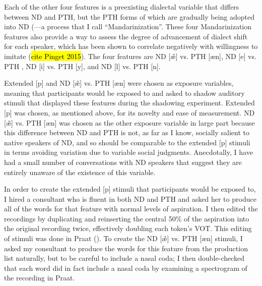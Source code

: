 Each of the other four features is a preexisting dialectal variable that differs between ND and PTH, but the PTH forms of which are gradually being adopted into ND (\cite{bao1980sixty}---a process that I call ``Mandarinization''. These four Mandarinization features also provide a way to assess the degree of advancement of dialect shift for each speaker, which has been shown to correlate negatively with willingness to imitate (\hl{cite Pinget 2015}). The four features are ND [\~{\ae}] vs. PTH [\ae n], ND [e] vs. PTH \textipa{[iE]}, ND [i] vs. PTH [y], and ND [l] vs. PTH [n].  %

Extended [p] and ND [\~{\ae}] vs. PTH [\ae n] were chosen as exposure variables, meaning that participants would be exposed to and asked to shadow auditory stimuli that displayed these features during the shadowing experiment. Extended [p] was chosen, as mentioned above, for its novelty and ease of measurement. ND [\~{\ae}] vs. PTH [\ae n] was chosen as the other exposure variable in large part because this difference between ND and PTH is not, as far as I know, socially salient to native speakers of ND, and so should be comparable to the extended [p] stimuli in terms avoiding variation due to variable social judgments. Anecdotally, I have had a small number of conversations with ND speakers that suggest they are entirely unaware of the existence of this variable.


In order to create the extended [p] stimuli that participants would be exposed to, I hired a consultant who is fluent in both ND and PTH and asked her to produce all of the words for that feature with normal levels of aspiration. I then edited the recordings by duplicating and reinserting the central 50\% of the aspiration into the original recording twice, effectively doubling each token’s VOT. This editing of stimuli was done in Praat (\cite{praat}). To create the ND [\~{\ae}] vs. PTH [\ae n] stimuli, I asked my consultant to produce the words for this feature from the production list naturally, but to be careful to include a nasal coda; I then double-checked that each word did in fact include a nasal coda by examining a spectrogram of the recording in Praat.

